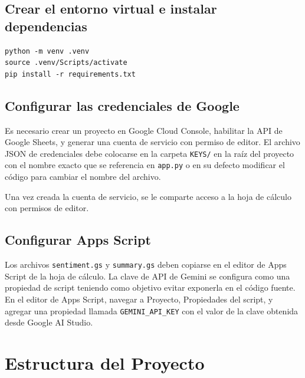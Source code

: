 \documentclass[12pt,a4paper]{article}
\begin{document}
\subsection{Crear el entorno virtual e instalar dependencias}

\begin{verbatim}
python -m venv .venv
source .venv/Scripts/activate
pip install -r requirements.txt
\end{verbatim}

\subsection{Configurar las credenciales de Google}

Es necesario crear un proyecto en Google Cloud Console, habilitar la API de Google Sheets, y generar una cuenta de servicio con permiso de editor. El archivo JSON de credenciales debe colocarse en la carpeta \texttt{KEYS/} en la raíz del proyecto con el nombre exacto que se referencia en \texttt{app.py} o en su defecto modificar el código para cambiar el nombre del archivo. 

Una vez creada la cuenta de servicio, se le comparte acceso a la hoja de cálculo con permisos de editor.

\subsection{Configurar Apps Script}

Los archivos \texttt{sentiment.gs} y \texttt{summary.gs} deben copiarse en el editor de Apps Script de la hoja de cálculo. La clave de API de Gemini se configura como una propiedad de script teniendo como objetivo evitar exponerla en el código fuente. En el editor de Apps Script, navegar a Proyecto, Propiedades del script, y agregar una propiedad llamada \texttt{GEMINI\_API\_KEY} con el valor de la clave obtenida desde Google AI Studio.

\section{Estructura del Proyecto}
\end{document}
